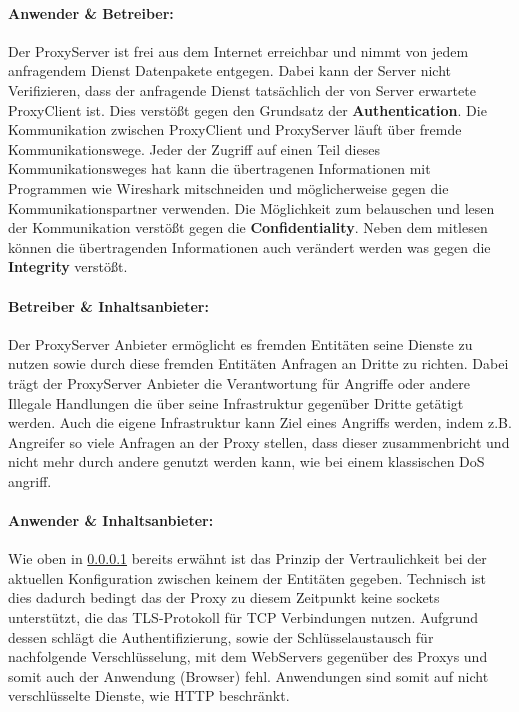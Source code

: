 \documentclass[12pt, a4paper]{scrartcl}
\begin{document}
\paragraph{Anwender \& Betreiber:}\label{ssec::anwender}
\noindent Der ProxyServer ist frei aus dem Internet erreichbar und nimmt von jedem anfragendem Dienst Datenpakete entgegen. Dabei kann der Server nicht Verifizieren, dass der anfragende Dienst tatsächlich der von Server erwartete ProxyClient ist. Dies verstößt gegen den Grundsatz der \textbf{Authentication}.\newline
Die Kommunikation zwischen ProxyClient und ProxyServer läuft über fremde Kommunikationswege. Jeder der Zugriff auf einen Teil dieses Kommunikationsweges hat kann die übertragenen Informationen mit Programmen wie Wireshark mitschneiden und möglicherweise gegen die Kommunikationspartner verwenden. Die Möglichkeit zum belauschen und lesen der Kommunikation verstößt gegen die \textbf{Confidentiality}.\newline
Neben dem mitlesen können die übertragenden Informationen auch verändert werden was gegen die \textbf{Integrity} verstößt.
\paragraph{Betreiber \& Inhaltsanbieter:}
Der ProxyServer Anbieter ermöglicht es fremden Entitäten seine Dienste zu nutzen sowie durch diese fremden Entitäten Anfragen an Dritte zu richten. Dabei trägt der ProxyServer Anbieter die Verantwortung für Angriffe oder andere Illegale Handlungen die über seine Infrastruktur gegenüber Dritte getätigt werden.\newline
Auch die eigene Infrastruktur kann Ziel eines Angriffs werden, indem z.B. Angreifer so viele Anfragen an der Proxy stellen, dass dieser zusammenbricht und nicht mehr durch andere genutzt werden kann, wie bei einem klassischen \ac{DoS} angriff.
\paragraph{Anwender \& Inhaltsanbieter:}
Wie oben in \ref{ssec::anwender} bereits erwähnt ist das Prinzip der Vertraulichkeit bei der aktuellen Konfiguration zwischen keinem der Entitäten gegeben. Technisch ist dies dadurch bedingt das der Proxy zu diesem Zeitpunkt keine sockets unterstützt, die das \ac{TLS}-Protokoll für TCP Verbindungen nutzen. Aufgrund dessen schlägt die Authentifizierung, sowie der Schlüsselaustausch für nachfolgende Verschlüsselung, mit dem WebServers gegenüber des Proxys und somit auch der Anwendung (Browser) fehl. Anwendungen sind somit auf nicht verschlüsselte Dienste, wie \acs{HTTP} beschränkt.
\end{document}
